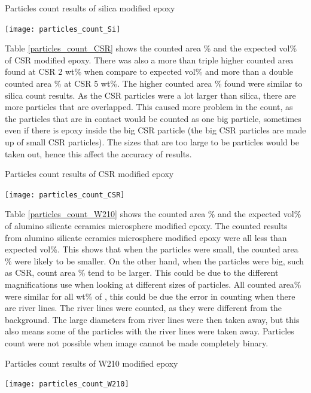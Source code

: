\documentclass[numbers=noendperiod,chapterprefix=on]{icldt} %
\begin{document}
\begin{table}[!htpb]
\centering
\caption{Particles count results of silica modified epoxy} \label{particles_count_Si}
\texttt{[image: particles\_count\_Si]}
\end{table}
\FloatBarrier

Table \ref{particles_count_CSR} shows the counted area \% and the expected vol\% of CSR modified epoxy.
There was also a more than triple higher counted area found at CSR 2 wt\% when compare to expected vol\% and more than a double counted area \% at CSR 5 wt\%. The higher counted area \% found were similar to silica count results. 
As the CSR particles were a lot larger than silica, there are more particles that are overlapped. This caused more problem in the count, as the particles that are in contact would be counted as one big particle, sometimes even if there is epoxy inside the big CSR particle (the big CSR particles are made up of small CSR particles). The sizes that are too large to be particles would be taken out, hence this affect the accuracy of results.

\begin{table}[!htpb]
\centering
\caption{Particles count results of CSR modified epoxy} \label{particles_count_CSR}
\texttt{[image: particles\_count\_CSR]}
\end{table}
\FloatBarrier

Table \ref{particles_count_W210} shows the counted area \% and the expected vol\% of alumino silicate ceramics microsphere modified epoxy.
The counted results from alumino silicate ceramics microsphere modified epoxy were all less than expected vol\%. This shows that when the particles were small, the counted area \% were likely to be smaller. On the other hand, when the particles were big, such as CSR, count area \% tend to be larger. This could be due to the different magnifications use when looking at different sizes of particles.
All counted area\% were similar for all wt\% of , this could be due the error in counting when there are river lines.
The river lines were counted, as they were different from the background. The large diameters from river lines were then taken away, but this also means some of the particles with the river lines were taken away. Particles count were not possible when image cannot be made completely binary.

\begin{table}[!htpb]
\centering
\caption{Particles count results of W210 modified epoxy} \label{particles_count_W210}
\texttt{[image: particles\_count\_W210]}
\end{table}
\FloatBarrier
\end{document}
